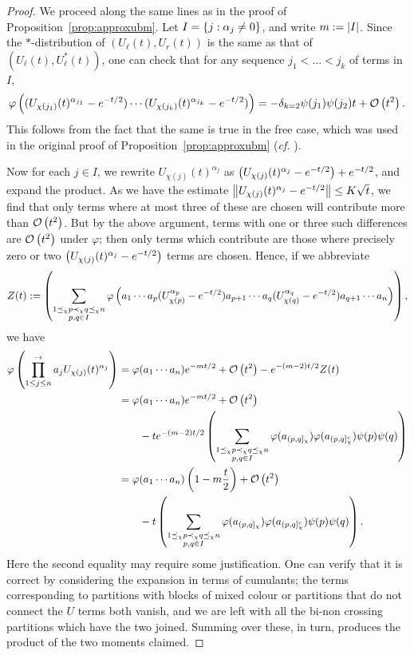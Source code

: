 \begin{proof}
	We proceed along the same lines as in the proof of Proposition~\ref{prop:approxubm}.
	Let $I = \left\{j : \alpha_j \neq 0\right\}$, and write $m := \left|I\right|$.
	Since the $*$-distribution of $(U_\ell(t), U_r(t))$ is the same as that of $(U_\ell(t), U_\ell^*(t))$, one can check that for any sequence $j_1 < \ldots < j_k$ of terms in $I$,
	$$\varphi\left((U_{\chi(j_1)}(t)^{\alpha_{j_1}}-e^{-t/2})\cdots(U_{\chi(j_k)}(t)^{\alpha_{j_k}}-e^{-t/2})\right)
	= -\delta_{k=2}\psi(j_1)\psi(j_2)t + \mathcal{O}\left(t^2\right).$$
	This follows from the fact that the same is true in the free case, which was used in the original proof of Proposition~\ref{prop:approxubm} (\emph{cf.} \cite{Voiculescu1999101}).

	Now for each $j \in I$, we rewrite $U_{\chi(j)}(t)^{\alpha_j}$ as $\left(U_{\chi(j)}(t)^{\alpha_j} - e^{-t/2}\right) + e^{-t/2}$, and expand the product.
	As we have the estimate $\left\|U_{\chi(j)}(t)^{\alpha_j} - e^{-t/2}\right\| \leq K\sqrt{t}$, we find that only terms where at most three of these are chosen will contribute more than $\mathcal{O}\left(t^2\right)$.
	But by the above argument, terms with one or three such differences are $\mathcal{O}\left(t^2\right)$ under $\varphi$;
	then only terms which contribute are those where precisely zero or two $\left(U_{\chi(j)}(t)^{\alpha_j} - e^{-t/2}\right)$ terms are chosen.
	Hence, if we abbreviate
	$$Z(t) := \left(\sum_{\substack{1 \preceq_\chi p \prec_\chi q \preceq_\chi n\\p, q \in I}} \varphi\left(a_1\cdots a_p (U_{\chi(p)}^{\alpha_p}-e^{-t/2}) a_{p+1}\cdots a_q (U_{\chi(q)}^{\alpha_q} - e^{-t/2}) a_{q+1}\cdots a_n\right)\right),$$
	we have
	\begin{align*}
		\varphi\left(\prod_{1\leq j \leq n}^{\rightarrow} a_jU_{\chi(j)}(t)^{\alpha_j}\right)
		&= \varphi(a_1\cdots a_n)e^{-mt/2} + \mathcal{O}\left(t^2\right) - e^{-(m-2)t/2}Z(t) \\
		&= \varphi(a_1\cdots a_n)e^{-mt/2} + \mathcal{O}\left(t^2\right) \\
		&\qquad- t e^{-(m-2)t/2} \left(\sum_{\substack{1 \preceq_\chi p \prec_\chi q \preceq_\chi n\\p, q \in I}} \varphi(a_{(p, q]_\chi})\varphi(a_{(p, q]_\chi^c})\psi(p)\psi(q)\right) \\
		&= \varphi(a_1\cdots a_n)\left(1 - m\frac{t}2\right) + \mathcal{O}\left(t^2\right) \\
		&\qquad- t\left(\sum_{\substack{1 \preceq_\chi p \prec_\chi q \preceq_\chi n\\p, q \in I}} \varphi(a_{(p, q]_\chi})\varphi(a_{(p, q]_\chi^c})\psi(p)\psi(q)\right).
	\end{align*}
	Here the second equality may require some justification.
	One can verify that it is correct by considering the expansion in terms of cumulants; the terms corresponding to partitions with blocks of mixed colour or partitions that do not connect the $U$ terms both vanish, and we are left with all the bi-non crossing partitions which have the two joined. Summing over these, in turn, produces the product of the two moments claimed.


\end{proof}
